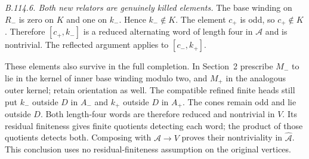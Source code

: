 \emph{B.114.6. Both new relators are genuinely killed elements.}
The base winding on $R_-$ is zero on $K$ and one on $k_-$.
Hence $k_-\notin K$. The element $c_+$ is odd, so $c_+\notin K$.
Therefore $[c_+,k_-]$ is a reduced alternating word of length
four in $\mathcal A$ and is nontrivial. The reflected argument
applies to $[c_-,k_+]$.

These elements also survive in the full completion. In Section~2
prescribe $M_-$ to lie in the kernel of inner base winding modulo
two, and $M_+$ in the analogous outer kernel; retain orientation
as well. The compatible refined finite heads still put $k_-$
outside $D$ in $A_-$ and $k_+$ outside $D$ in $A_+$. The cones
remain odd and lie outside $D$. Both length-four words are
therefore reduced and nontrivial in $V$. Its residual finiteness
gives finite quotients detecting each word; the product of those
quotients detects both. Composing with $\mathcal A\to V$ proves
their nontriviality in $\widehat{\mathcal A}$. This conclusion
uses no residual-finiteness assumption on the original vertices.

